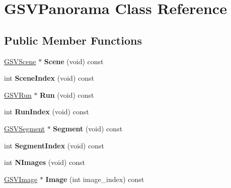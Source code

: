 \hypertarget{class_g_s_v_panorama}{}\section{G\+S\+V\+Panorama Class Reference}
\label{class_g_s_v_panorama}
\subsection*{Public Member Functions}
\begin{DoxyCompactItemize}
\item 
\hyperlink{class_g_s_v_scene}{G\+S\+V\+Scene} $\ast$ {\bfseries Scene} (void) const \hypertarget{class_g_s_v_panorama_ab86070f64ea38217ace866e0677f9095}{}\label{class_g_s_v_panorama_ab86070f64ea38217ace866e0677f9095}

\item 
int {\bfseries Scene\+Index} (void) const \hypertarget{class_g_s_v_panorama_a8e97213ba5eec4bcfe880c4d70e6ace9}{}\label{class_g_s_v_panorama_a8e97213ba5eec4bcfe880c4d70e6ace9}

\item 
\hyperlink{class_g_s_v_run}{G\+S\+V\+Run} $\ast$ {\bfseries Run} (void) const \hypertarget{class_g_s_v_panorama_a7c6b4767930ac31d662ea498394a526e}{}\label{class_g_s_v_panorama_a7c6b4767930ac31d662ea498394a526e}

\item 
int {\bfseries Run\+Index} (void) const \hypertarget{class_g_s_v_panorama_ab30123d6188a792ded266603b815bec9}{}\label{class_g_s_v_panorama_ab30123d6188a792ded266603b815bec9}

\item 
\hyperlink{class_g_s_v_segment}{G\+S\+V\+Segment} $\ast$ {\bfseries Segment} (void) const \hypertarget{class_g_s_v_panorama_a26ccdc213efb2f952e074d6705102fe5}{}\label{class_g_s_v_panorama_a26ccdc213efb2f952e074d6705102fe5}

\item 
int {\bfseries Segment\+Index} (void) const \hypertarget{class_g_s_v_panorama_accf0027fbd436f5625b8400c61dee07a}{}\label{class_g_s_v_panorama_accf0027fbd436f5625b8400c61dee07a}

\item 
int {\bfseries N\+Images} (void) const \hypertarget{class_g_s_v_panorama_a3744a6f7219a77b436492b6603434aa4}{}\label{class_g_s_v_panorama_a3744a6f7219a77b436492b6603434aa4}

\item 
\hyperlink{class_g_s_v_image}{G\+S\+V\+Image} $\ast$ {\bfseries Image} (int image\+\_\+index) const \hypertarget{class_g_s_v_panorama_a1ef7000c20100b09cce0c273937e5fb6}{}\label{class_g_s_v_panorama_a1ef7000c20100b09cce0c273937e5fb6}


\end{DoxyCompactItemize}
